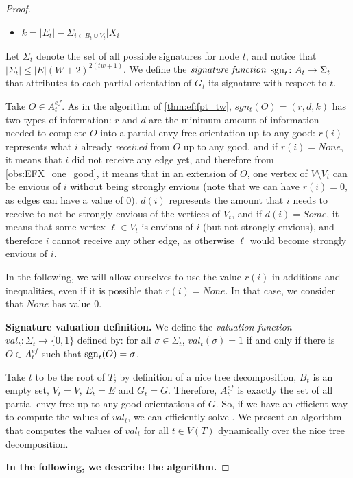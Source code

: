\begin{proof}
\begin{itemize}
        \item $k=|E_t|-\Sigma_{i\in B_t\cup V_t}|X_i|$
    \end{itemize}

    Let $\Sigma_t$ denote the set of all possible signatures for node $t$, and notice that $|\Sigma_t|\leq |E|(W+2)^{2(tw+1)}$. We define the $\emph{signature function}$ $\operatorname{sgn}_t\colon A_t\to \Sigma_t$ that attributes to each partial orientation of $G_t$ its signature with respect to $t$.

    Take $O\in A_t^{ef}$. As in the algorithm of \cref{thm:ef:fpt_tw}, $sgn_t(O)=(r,d,k)$ has two types of information: $r$ and $d$ are the minimum amount of information needed to complete $O$ into a partial envy-free orientation up to any good: $r(i)$ represents what $i$ already \emph{received} from $O$ up to any good, and if $r(i)=None$, it means that $i$ did not receive any edge yet, and therefore from \cref{obs:EFX_one_good}, it means that in an extension of $O$, one vertex of $V\setminus V_t$ can be envious of $i$ without being strongly envious (note that we can have $r(i)=0$, as edges can have a value of $0$). $d(i)$ represents the amount that $i$ needs to receive to not be strongly envious of the vertices of $V_t$, and if $d(i)=Some$, it means that some vertex $\ell\in V_t$ is envious of $i$ (but not strongly envious), and therefore $i$ cannot receive any other edge, as otherwise $\ell$ would become strongly envious of $i$.

    In the following, we will allow ourselves to use the value $r(i)$ in additions and inequalities, even if it is possible that $r(i)=None$. In that case, we consider that $None$ has value $0$.

    \textbf{Signature valuation definition.} We define the \emph{valuation function} $val_t\colon \Sigma_t\to \{0,1\}$ defined by: for all $\sigma\in \Sigma_t$, $val_t(\sigma)=1$ if and only if there is $O\in A_t^{ef}$ such that $\operatorname{sgn}_t(O)=\sigma$.

    Take $t$ to be the root of $T$; by definition of a nice tree decomposition, $B_t$ is an empty set, $V_t=V$, $E_t=E$ and $G_t=G$. Therefore, $A_t^{ef}$ is exactly the set of all partial envy-free up to any good orientations of $G$. So, if we have an efficient way to compute the values of $val_t$, we can efficiently solve \EFXmc. We present an algorithm that computes the values of $val_t$ for all $t\in V(T)$ dynamically over the nice tree decomposition.

    \textbf{In the following, we describe the algorithm.}


\end{proof}
